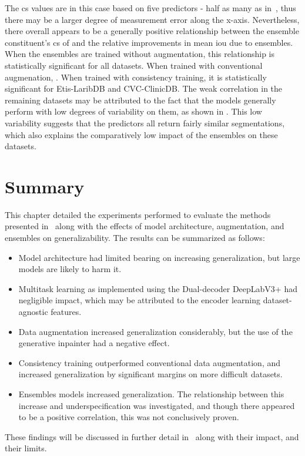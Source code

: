 The \gls{cs} values are in this case based on five predictors - half as many as in~, thus there may be a larger degree of measurement error along the x-axis. Nevertheless, there overall appears to be a generally positive relationship between the ensemble constituent's \gls{cs} of  and the relative improvements in mean \gls{iou} due to ensembles. When the ensembles are trained without augmentation, this relationship is statistically significant for all datasets. When trained with conventional augmenation, . When trained with consistency training, it is statistically significant for Etis-LaribDB and CVC-ClinicDB. The weak correlation in the remaining datasets may be attributed to the fact that the models generally perform with low degrees of variability on them, as shown in . This low variability suggests that the predictors all return fairly similar segmentations, which also explains the comparatively low impact of the ensembles on these datasets.  


\section{Summary}
This chapter detailed the experiments performed to evaluate the methods presented in~ along with the effects of model architecture, augmentation, and ensembles on generalizability. The results can be summarized as follows:
\begin{itemize}
    \item Model architecture had limited bearing on increasing generalization, but large models are likely to harm it.
    \item Multitask learning as implemented using the Dual-decoder DeepLabV3+ had negligible impact, which may be attributed to the encoder learning dataset-agnostic features.
    \item Data augmentation increased generalization considerably, but the use of the generative inpainter had a negative effect.
    \item Consistency training outperformed conventional data augmentation, and increased generalization by significant margins on more difficult datasets.
    \item Ensembles models increased generalization. The relationship between this increase and underspecification was investigated, and though there appeared to be a positive correlation, this was not conclusively proven.
\end{itemize}

These findings will be discussed in further detail in~ along with their impact, and their limits. 
